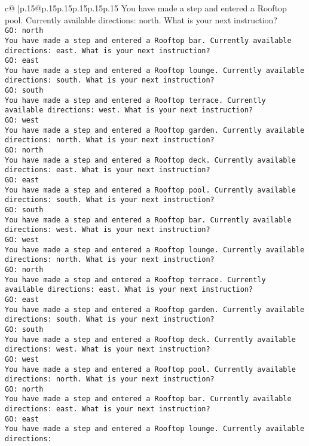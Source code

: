 \documentclass{article}
\begin{document}
{\begin{supertabular}{c@{$\;$}|p{.15\linewidth}@{}p{.15\linewidth}p{.15\linewidth}p{.15\linewidth}p{.15\linewidth}p{.15\linewidth}}
{{{You have made a step and entered a Rooftop pool. Currently available directions: north. What is your next instruction?\\ \tt GO: north\\ \tt You have made a step and entered a Rooftop bar. Currently available directions: east. What is your next instruction?\\ \tt GO: east\\ \tt You have made a step and entered a Rooftop lounge. Currently available directions: south. What is your next instruction?\\ \tt GO: south\\ \tt You have made a step and entered a Rooftop terrace. Currently available directions: west. What is your next instruction?\\ \tt GO: west\\ \tt You have made a step and entered a Rooftop garden. Currently available directions: north. What is your next instruction?\\ \tt GO: north\\ \tt You have made a step and entered a Rooftop deck. Currently available directions: east. What is your next instruction?\\ \tt GO: east\\ \tt You have made a step and entered a Rooftop pool. Currently available directions: south. What is your next instruction?\\ \tt GO: south\\ \tt You have made a step and entered a Rooftop bar. Currently available directions: west. What is your next instruction?\\ \tt GO: west\\ \tt You have made a step and entered a Rooftop lounge. Currently available directions: north. What is your next instruction?\\ \tt GO: north\\ \tt You have made a step and entered a Rooftop terrace. Currently available directions: east. What is your next instruction?\\ \tt GO: east\\ \tt You have made a step and entered a Rooftop garden. Currently available directions: south. What is your next instruction?\\ \tt GO: south\\ \tt You have made a step and entered a Rooftop deck. Currently available directions: west. What is your next instruction?\\ \tt GO: west\\ \tt You have made a step and entered a Rooftop pool. Currently available directions: north. What is your next instruction?\\ \tt GO: north\\ \tt You have made a step and entered a Rooftop bar. Currently available directions: east. What is your next instruction?\\ \tt GO: east\\ \tt You have made a step and entered a Rooftop lounge. Currently available directions: }}}
\end{supertabular}}
\end{document}
